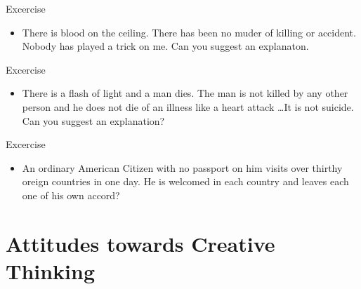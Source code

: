 \documentclass[notes]{beamer}
\begin{document}
\begin{frame}{Excercise}
	\begin{itemize}
		\item There is blood on the ceiling. There has been no muder of killing or accident. Nobody has played a trick on me. Can you suggest an explanaton. 
	\end{itemize}

\end{frame}

\begin{frame}{Excercise}
	\begin{itemize}
		\item There is a flash of light and a man dies. The man is not killed by any other person and he does not die of an illness like a heart attack \dots It is not suicide. Can you suggest an explanation?
	\end{itemize}
	
\end{frame} 

\begin{frame}{Excercise}
	\begin{itemize}
		\item An ordinary American Citizen with no passport on him visits over thirthy oreign countries in one day. He is welcomed in each country and leaves each one of his own accord?
	\end{itemize}
	
\end{frame}

\section{Attitudes towards Creative Thinking}

\end{document}
